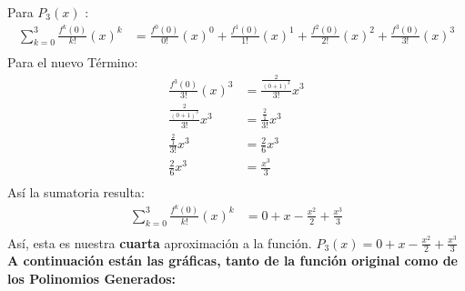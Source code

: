Para $P_{3}(x)$ :
\begin{align*}
   \sum_{k=0}^{3} \frac{f^{k}(0)}{k!}(x)^{k} &= \frac{f^{0}(0)}{0!}(x)^{0} + \frac{f^{1}(0)}{1!}(x)^{1} + \frac{f^{2}(0)}{2!}(x)^{2} + \frac{f^{3}(0)}{3!}(x)^{3}\\
\end{align*}
Para el nuevo Término:
\begin{align*}
   \frac{f^{3}(0)}{3!}(x)^{3}                   &= \frac{\frac{2}{(0+1)^{3}}}{3!}x^{3} \\
   \frac{\frac{2}{(0+1)^{3}}}{3!}x^{3}         &= \frac{\frac{2}{1}}{3!}x^{3} \\
   \frac{\frac{2}{1}}{3!}x^{3}                  &= \frac{2}{6}x^{3}  \\
   \frac{2}{6}x^{3}                            &= \frac{x^{3}}{3}\\
\end{align*}
Así la sumatoria resulta:
\begin{align*}
   \sum_{k=0}^{3} \frac{f^{k}(0)}{k!}(x)^{k} &= 0 + x -\frac{x^{2}}{2} + \frac{x^{3}}{3}\\
\end{align*}
Así, esta es nuestra \textbf{cuarta} aproximación a la función. $P_{3}(x) = 0 + x -\frac{x^{2}}{2} + \frac{x^{3}}{3}$ \\

\textbf{A continuación están las gráficas, tanto de la función original como de los Polinomios Generados:} \\

